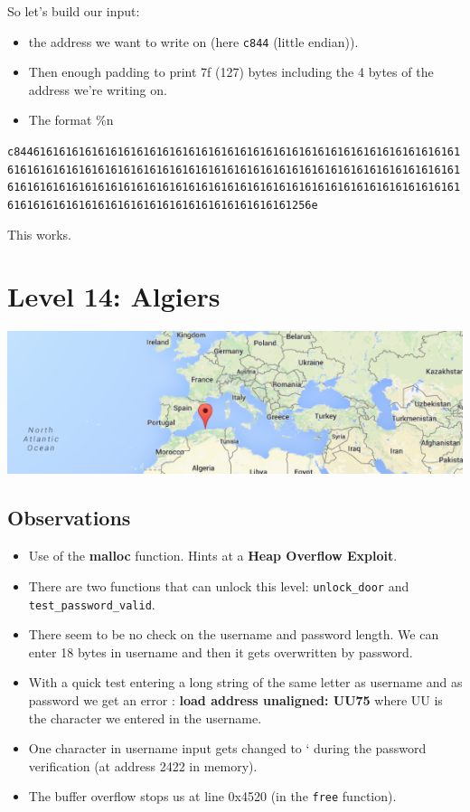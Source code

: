 So let's build our input:

\begin{itemize}
\itemsep1pt\parskip0pt
\item
  the address we want to write on (here \texttt{c844} (little endian)).
\item
  Then enough padding to print 7f (127) bytes including the 4 bytes of
  the address we're writing on.
\item
  The format \%n
\end{itemize}

\texttt{c8446161616161616161616161616161616161616161616161616161616161616161616161616161616161616161616161616161616161616161616161616161616161616161616161616161616161616161616161616161616161616161616161616161616161616161616161616161616161616161616161616161616161256e}

This works.

\section{Level 14: Algiers}\label{level-14-algiers}

\includegraphics{img/14_1.PNG}

\subsection{Observations}\label{observations-6}

\begin{itemize}
\itemsep1pt\parskip0pt
\item
  Use of the \textbf{malloc} function. Hints at a \textbf{Heap Overflow
  Exploit}.
\item
  There are two functions that can unlock this level:
  \texttt{unlock\_door} and \texttt{test\_password\_valid}.
\item
  There seem to be no check on the username and password length. We can
  enter 18 bytes in username and then it gets overwritten by password.
\item
  With a quick test entering a long string of the same letter as
  username and as password we get an error : \textbf{load address
  unaligned: UU75} where UU is the character we entered in the username.
\item
  One character in username input gets changed to ` during the password
  verification (at address 2422 in memory).
\item
  The buffer overflow stops us at line 0x4520 (in the \texttt{free}
  function).
\end{itemize}

